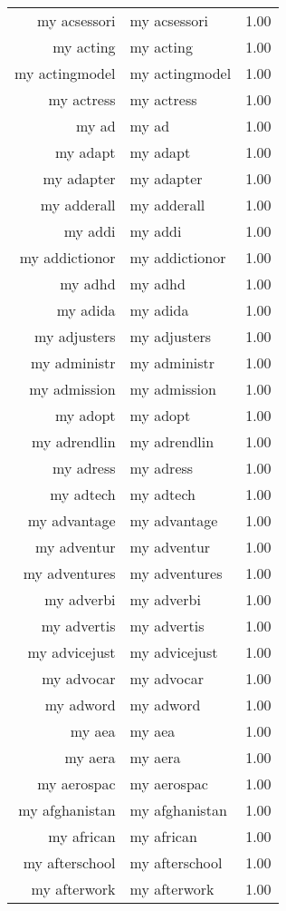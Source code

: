 \begin{table}[ht]
\begin{tabular}{rlr}
  my acsessori & my acsessori & 1.00 \\ 
  my acting & my acting & 1.00 \\ 
  my actingmodel & my actingmodel & 1.00 \\ 
  my actress & my actress & 1.00 \\ 
  my ad & my ad & 1.00 \\ 
  my adapt & my adapt & 1.00 \\ 
  my adapter & my adapter & 1.00 \\ 
  my adderall & my adderall & 1.00 \\ 
  my addi & my addi & 1.00 \\ 
  my addictionor & my addictionor & 1.00 \\ 
  my adhd & my adhd & 1.00 \\ 
  my adida & my adida & 1.00 \\ 
  my adjusters & my adjusters & 1.00 \\ 
  my administr & my administr & 1.00 \\ 
  my admission & my admission & 1.00 \\ 
  my adopt & my adopt & 1.00 \\ 
  my adrendlin & my adrendlin & 1.00 \\ 
  my adress & my adress & 1.00 \\ 
  my adtech & my adtech & 1.00 \\ 
  my advantage & my advantage & 1.00 \\ 
  my adventur & my adventur & 1.00 \\ 
  my adventures & my adventures & 1.00 \\ 
  my adverbi & my adverbi & 1.00 \\ 
  my advertis & my advertis & 1.00 \\ 
  my advicejust & my advicejust & 1.00 \\ 
  my advocar & my advocar & 1.00 \\ 
  my adword & my adword & 1.00 \\ 
  my aea & my aea & 1.00 \\ 
  my aera & my aera & 1.00 \\ 
  my aerospac & my aerospac & 1.00 \\ 
  my afghanistan & my afghanistan & 1.00 \\ 
  my african & my african & 1.00 \\ 
  my afterschool & my afterschool & 1.00 \\ 
  my afterwork & my afterwork & 1.00 \\ 

\end{tabular}
\end{table}
